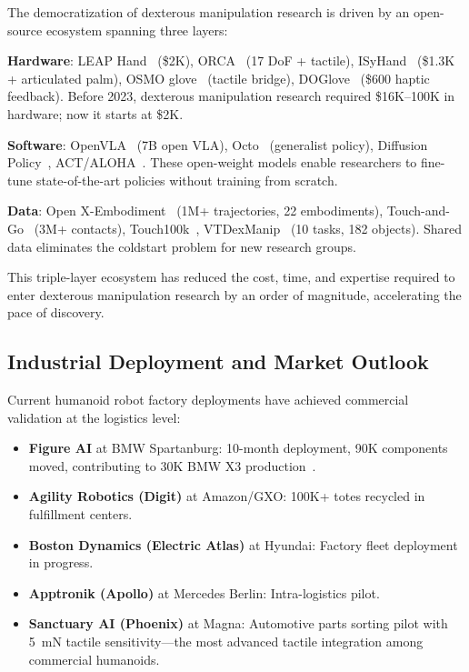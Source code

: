 The democratization of dexterous manipulation research is driven by an open-source ecosystem spanning three layers:

\textbf{Hardware}: LEAP Hand~\cite{shaw2023leap} (\$2K), ORCA~\cite{christoph2025orca} (17 DoF + tactile), ISyHand~\cite{richardson2025isyhand} (\$1.3K + articulated palm), OSMO glove~\cite{yin2025osmo} (tactile bridge), DOGlove~\cite{zhang2025doglove} (\$600 haptic feedback). Before 2023, dexterous manipulation research required \$16K--100K in hardware; now it starts at \$2K.

\textbf{Software}: OpenVLA~\cite{kim2024openvla} (7B open VLA), Octo~\cite{octo2024} (generalist policy), Diffusion Policy~\cite{chi2023diffusion}, ACT/ALOHA~\cite{zhao2023aloha}. These open-weight models enable researchers to fine-tune state-of-the-art policies without training from scratch.

\textbf{Data}: Open X-Embodiment~\cite{oxe2024} (1M+ trajectories, 22 embodiments), Touch-and-Go~\cite{yang2022touchandgo} (3M+ contacts), Touch100k~\cite{yang2024touch100k}, VTDexManip~\cite{liu2025vtdexmanip} (10 tasks, 182 objects). Shared data eliminates the coldstart problem for new research groups.

This triple-layer ecosystem has reduced the cost, time, and expertise required to enter dexterous manipulation research by an order of magnitude, accelerating the pace of discovery.

\subsection{Industrial Deployment and Market Outlook}

Current humanoid robot factory deployments have achieved commercial validation at the logistics level:

\begin{itemize}
    \item \textbf{Figure AI} at BMW Spartanburg: 10-month deployment, 90K components moved, contributing to 30K BMW X3 production~\cite{figureai2025}.
    \item \textbf{Agility Robotics (Digit)} at Amazon/GXO: 100K+ totes recycled in fulfillment centers.
    \item \textbf{Boston Dynamics (Electric Atlas)} at Hyundai: Factory fleet deployment in progress.
    \item \textbf{Apptronik (Apollo)} at Mercedes Berlin: Intra-logistics pilot.
    \item \textbf{Sanctuary AI (Phoenix)} at Magna: Automotive parts sorting pilot with 5~mN tactile sensitivity---the most advanced tactile integration among commercial humanoids.
\end{itemize}

